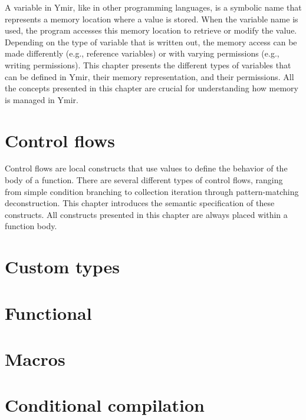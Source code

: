\documentclass[twoside,a4paper,11pt]{book}
\begin{document}
A variable in Ymir, like in other programming languages, is a symbolic name that
represents a memory location where a value is stored. When the variable name is
used, the program accesses this memory location to retrieve or modify the value.
Depending on the type of variable that is written out, the memory access can be
made differently (e.g., reference variables) or with varying permissions (e.g.,
writing permissions). This chapter presents the different types of variables
that can be defined in Ymir, their memory representation, and their permissions.
All the concepts presented in this chapter are crucial for understanding how
memory is managed in Ymir.

\begin{multicols*}{2}
  \minitoc%
  
\end{multicols*}

\chapter{Control flows}%
\label{chap:control_flows}

Control flows are local constructs that use values to define the behavior of the
body of a function. There are several different types of control flows, ranging
from simple condition branching to collection iteration through pattern-matching
deconstruction. This chapter introduces the semantic specification of these
constructs. All constructs presented in this chapter are always placed within a
function body.

\begin{multicols*}{2}
  \minitoc%
  
\end{multicols*}

\chapter{Custom types}%
\label{chap:custom_types}

\begin{multicols*}{2}
  \minitoc%
  
\end{multicols*}

\chapter{Functional}
\label{chap:functional}

\begin{multicols*}{2}
  \minitoc%
  
\end{multicols*}

\chapter{Macros}
\label{chap:macros}

\begin{multicols*}{2}
  \minitoc%
\end{multicols*}


\chapter{Conditional compilation}
\label{chap:conditional_compilation}

\begin{multicols*}{2}
  \minitoc%
\end{multicols*}
\end{document}
